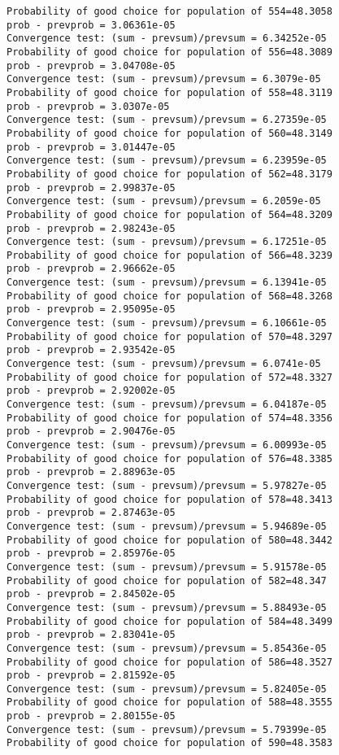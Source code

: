 \documentclass[11pt,onecolumn]{article}
\begin{document}
\begin{verbatim}
Probability of good choice for population of 554=48.3058
prob - prevprob = 3.06361e-05
Convergence test: (sum - prevsum)/prevsum = 6.34252e-05
Probability of good choice for population of 556=48.3089
prob - prevprob = 3.04708e-05
Convergence test: (sum - prevsum)/prevsum = 6.3079e-05
Probability of good choice for population of 558=48.3119
prob - prevprob = 3.0307e-05
Convergence test: (sum - prevsum)/prevsum = 6.27359e-05
Probability of good choice for population of 560=48.3149
prob - prevprob = 3.01447e-05
Convergence test: (sum - prevsum)/prevsum = 6.23959e-05
Probability of good choice for population of 562=48.3179
prob - prevprob = 2.99837e-05
Convergence test: (sum - prevsum)/prevsum = 6.2059e-05
Probability of good choice for population of 564=48.3209
prob - prevprob = 2.98243e-05
Convergence test: (sum - prevsum)/prevsum = 6.17251e-05
Probability of good choice for population of 566=48.3239
prob - prevprob = 2.96662e-05
Convergence test: (sum - prevsum)/prevsum = 6.13941e-05
Probability of good choice for population of 568=48.3268
prob - prevprob = 2.95095e-05
Convergence test: (sum - prevsum)/prevsum = 6.10661e-05
Probability of good choice for population of 570=48.3297
prob - prevprob = 2.93542e-05
Convergence test: (sum - prevsum)/prevsum = 6.0741e-05
Probability of good choice for population of 572=48.3327
prob - prevprob = 2.92002e-05
Convergence test: (sum - prevsum)/prevsum = 6.04187e-05
Probability of good choice for population of 574=48.3356
prob - prevprob = 2.90476e-05
Convergence test: (sum - prevsum)/prevsum = 6.00993e-05
Probability of good choice for population of 576=48.3385
prob - prevprob = 2.88963e-05
Convergence test: (sum - prevsum)/prevsum = 5.97827e-05
Probability of good choice for population of 578=48.3413
prob - prevprob = 2.87463e-05
Convergence test: (sum - prevsum)/prevsum = 5.94689e-05
Probability of good choice for population of 580=48.3442
prob - prevprob = 2.85976e-05
Convergence test: (sum - prevsum)/prevsum = 5.91578e-05
Probability of good choice for population of 582=48.347
prob - prevprob = 2.84502e-05
Convergence test: (sum - prevsum)/prevsum = 5.88493e-05
Probability of good choice for population of 584=48.3499
prob - prevprob = 2.83041e-05
Convergence test: (sum - prevsum)/prevsum = 5.85436e-05
Probability of good choice for population of 586=48.3527
prob - prevprob = 2.81592e-05
Convergence test: (sum - prevsum)/prevsum = 5.82405e-05
Probability of good choice for population of 588=48.3555
prob - prevprob = 2.80155e-05
Convergence test: (sum - prevsum)/prevsum = 5.79399e-05
Probability of good choice for population of 590=48.3583

\end{verbatim}
\end{document}
